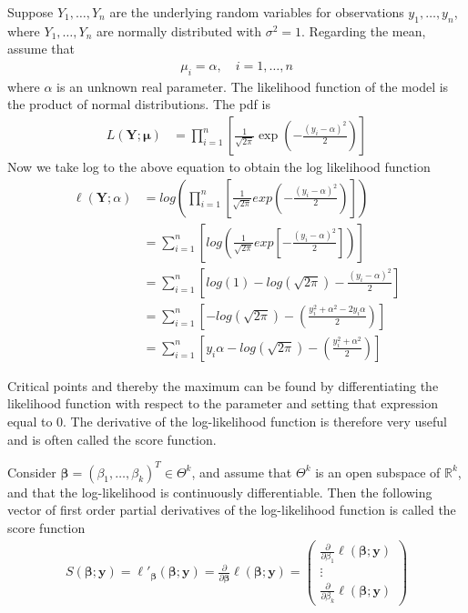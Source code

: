 \begin{example} \label{ex:model1}
Suppose $Y_1,\ldots,Y_n$ are the underlying random variables for observations $y_1,\ldots,y_n$, where $Y_1,\ldots,Y_n$ are normally distributed with $\sigma^2 = 1$. Regarding the mean, assume that
\begin{align*}
    \mu_i = \alpha, \quad i = 1, \ldots,n
\end{align*}
where $\alpha$ is an unknown real parameter. 
The likelihood function of the model is the product of normal distributions. The pdf is 
\begin{align*}
   L(\textbf{Y};\boldsymbol{\mu}) &= \prod_{i=1}^n \left[ \frac{1}{ \sqrt{2 \pi}}\exp\left(-\frac{(y_i -\alpha)^2}{2}\right) \right]
\end{align*}
Now we take log to the above equation to obtain the log likelihood function
\begin{align*}
   \ell(\textbf{Y};\alpha) &= log \left( \prod_{i=1}^n \left[ \frac{1}{\sqrt{2 \pi}}exp\left(-\frac{(y_i -\alpha)^2}{2}\right) \right] \right)\\
   &= \sum_{i = 1}^n \left[ log\left( \frac{1}{\sqrt{2 \pi}}exp\left[-\frac{(y_i - \alpha)^2}{2}\right] \right) \right]\\
   &= \sum_{i = 1}^n \left[ log(1) - log(\sqrt{2 \pi}) - \frac{(y_i - \alpha)^2}{2} \right]\\
   &= \sum_{i = 1}^n \left[- log\left( \sqrt{2 \pi}\right) - \left(\frac{y_i^2 + \alpha^2 - 2y_i\alpha}{2}\right) \right]\\
   &= \sum_{i = 1}^n \left[y_i \alpha - log\left( \sqrt{2 \pi}\right) - \left( \frac{y_i^2 + \alpha^2}{2} \right) \right]
\end{align*}
\end{example}
Critical points and thereby the maximum can be found by differentiating the likelihood function with respect to the parameter and setting that expression equal to 0. The derivative of the log-likelihood function is therefore very useful and is often called the score function. 
\begin{definition}
\label{def:score_function}
Consider $\boldsymbol{\beta} = (\beta_1, \ldots, \beta_k)^T \in \Theta^k$, and assume that $\Theta^k$ is an open subspace of $\mathbb{R}^k$, and that the log-likelihood is continuously differentiable. Then the following vector of first order partial derivatives of the log-likelihood function is called the score function
\begin{align*}
    S(\boldsymbol{\beta}; \textbf{y}) = \ell'_{\boldsymbol{\beta}}(\boldsymbol{\beta}; \textbf{y}) = \frac{\partial}{\partial \boldsymbol{\beta}} \ell (\boldsymbol{\beta}; \textbf{y}) = 
    \begin{pmatrix}
        \frac{\partial}{\partial \beta_1}\ell (\boldsymbol{\beta}; \textbf{y}) \\
        \vdots \\
        \frac{\partial}{\partial \beta_k}\ell (\boldsymbol{\beta}; \textbf{y})
    \end{pmatrix}
\end{align*}
\end{definition}
